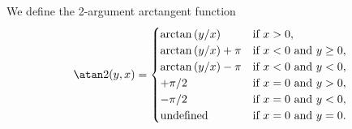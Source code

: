 \begin{definition}\label{calculus-0017}%
We define the 2-argument arctangent function
\begin{equation}
\atan2(y, x) =
\begin{cases}
 \arctan\left(y/x\right) &\mbox{if } x > 0, \\
 \arctan\left(y/x\right) + \pi &\mbox{if } x < 0 \mbox{ and } y \geq 0, \\
 \arctan\left(y/x\right) - \pi &\mbox{if } x < 0 \mbox{ and } y < 0, \\
 +\pi/2 &\mbox{if } x = 0 \mbox{ and } y > 0, \\
 -\pi/2 &\mbox{if } x = 0 \mbox{ and } y < 0, \\
 \mbox{undefined} &\mbox{if } x = 0 \mbox{ and } y = 0.
\end{cases}
\end{equation}
\end{definition}

